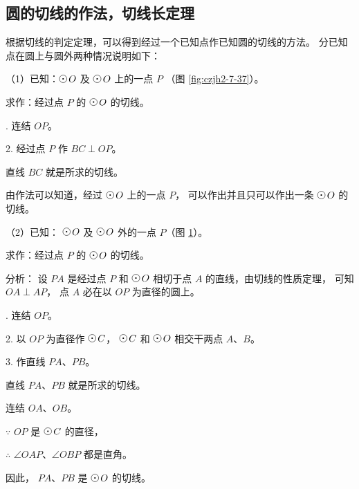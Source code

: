 \subsection{圆的切线的作法，切线长定理}\label{subsec:czjh2-7-9}

根据切线的判定定理，可以得到经过一个已知点作已知圆的切线的方法。
分已知点在圆上与圆外两种情况说明如下：

（1）已知：$\yuan\,O$ 及 $\yuan\,O$ 上的一点 $P$ （图 \ref{fig:czjh2-7-37}）。

求作：经过点 $P$ 的 $\yuan\,O$ 的切线。

. 连结 $OP$。

2. 经过点 $P$ 作 $BC \perp OP$。

直线 $BC$ 就是所求的切线。

由作法可以知道，经过 $\yuan\,O$ 上的一点 $P$，
可以作出并且只可以作出一条 $\yuan\,O$ 的切线。

\begin{figure}[htbp]
    \centering
    \begin{minipage}[b]{7cm}
        \centering
        
        \caption{}\label{fig:czjh2-7-37}
    \end{minipage}
    \qquad
    \begin{minipage}[b]{7cm}
        \centering
        
        \caption{}\label{fig:czjh2-7-38}
    \end{minipage}
\end{figure}

（2）已知： $\yuan\,O$ 及 $\yuan\,O$ 外的一点 $P$（图 \ref{fig:czjh2-7-38}）。

求作：经过点 $P$ 的 $\yuan\,O$ 的切线。

分析： 设 $PA$ 是经过点 $P$ 和 $\yuan\,O$ 相切于点 $A$ 的直线，由切线的性质定理，
可知 $OA \perp AP$， 点 $A$ 必在以 $OP$ 为直径的圆上。

. 连结 $OP$。

2. 以 $OP$ 为直径作 $\yuan\,C$， $\yuan\,C$ 和 $\yuan\,O$ 相交干两点 $A$、$B$。

3. 作直线 $PA$、$PB$。

直线 $PA$、$PB$ 就是所求的切线。

\zhengming 连结 $OA$、$OB$。

$\because$ \quad $OP$ 是 $\yuan\,C$ 的直径，

$\therefore$ \quad $\angle OAP$、$\angle OBP$ 都是直角。

因此， $PA$、$PB$ 是 $\yuan\,O$ 的切线。

